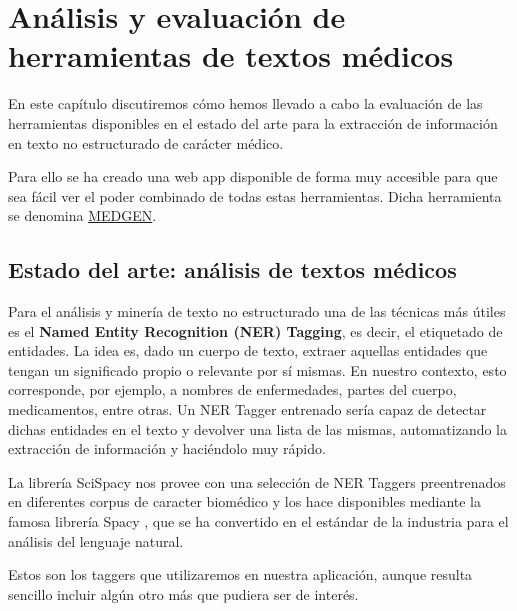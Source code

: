 \chapter{Análisis y evaluación de \\herramientas de textos médicos}

En este capítulo discutiremos cómo hemos llevado a cabo la evaluación de las herramientas disponibles en el estado del arte para la extracción de información en texto no estructurado de carácter médico.

Para ello se ha creado una web app disponible de forma muy accesible para que sea fácil ver el poder combinado de todas estas herramientas. Dicha herramienta se denomina \href{https://share.streamlit.io/jesi-rgb/medical-text-analysis/src/streamlit_gen_test.py}{MEDGEN}.

\section{Estado del arte: análisis de textos médicos}

Para el análisis y minería de texto no estructurado una de las técnicas más útiles es el \textbf{Named Entity Recognition (NER) Tagging}, es decir, el etiquetado de entidades. La idea es, dado un cuerpo de texto, extraer aquellas entidades que tengan un significado propio o relevante por sí mismas. En nuestro contexto, esto corresponde, por ejemplo, a nombres de enfermedades, partes del cuerpo, medicamentos, entre otras. Un NER Tagger entrenado sería capaz de detectar dichas entidades en el texto y devolver una lista de las mismas, automatizando la extracción de información y haciéndolo muy rápido.

La librería SciSpacy \cite{neumann-etal-2019-scispacy} nos provee con una selección de NER Taggers preentrenados en diferentes corpus de caracter biomédico y los hace disponibles mediante la famosa librería Spacy \cite{spacy}, que se ha convertido en el estándar de la industria para el análisis del lenguaje natural.

Estos son los taggers que utilizaremos en nuestra aplicación, aunque resulta sencillo incluir algún otro más que pudiera ser de interés.

